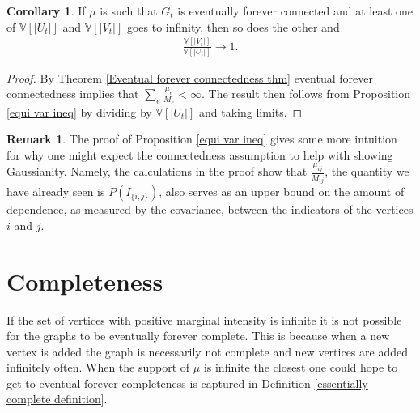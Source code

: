 \documentclass[12pt]{article}
\theoremstyle{definition}
\newtheorem{corollary}[proposition]{Corollary}
\newtheorem{remark}[proposition]{Remark}
\begin{document}
\begin{corollary}
    If $\mu$ is such that $G_t$ is eventually forever connected and at least one of $\mathbb{V}[|U_t|]$ and $\mathbb{V}[|V_t|]$ goes to infinity, then so does the other and \begin{align*}
        \frac{\mathbb{V}[|V_t|]}{\mathbb{V}[|U_t|]} \rightarrow 1.
    \end{align*}
\end{corollary}
\begin{proof}
    By Theorem \ref{Eventual forever connectedness thm} eventual forever connectedness implies that $\sum_e \frac{\mu_e}{M_e} < \infty$. The result then follows from Proposition \ref{equi var ineq} by dividing by $\mathbb{V}[|U_t|]$ and taking limits.
\end{proof}

\begin{remark} 
    The proof of Proposition \ref{equi var ineq} gives some more intuition for why one might expect the connectedness assumption to help with showing Gaussianity. Namely, the calculations in the proof show that $\frac{\mu_{ij}}{M_{ij}}$, the quantity we have already seen is $P(I_{\{i,j\}})$, also serves as an upper bound on the amount of dependence, as measured by the covariance, between the indicators of the vertices $i$ and $j$.
\end{remark}


\section{Completeness}\label{Completeness}

If the set of vertices with positive marginal intensity is infinite it is not possible for the graphs to be eventually forever complete. This is because when a new vertex is added the graph is necessarily not complete and new vertices are added infinitely often. When the support of $\mu$ is infinite the closest one could hope to get to eventual forever completeness is captured in Definition \ref{essentially complete definition}.
\end{document}
